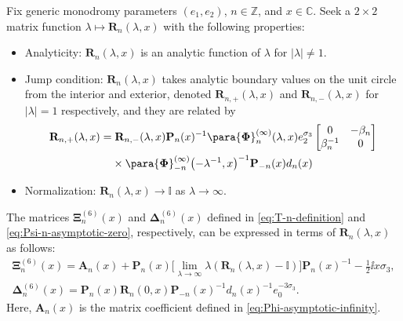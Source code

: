 \begin{rhp}
Fix generic monodromy parameters $( e_1, e_2)$, $n\in\mathbb{Z}$, and $x\in\mathbb{C}$. Seek a $2\times 2$ matrix function $\lambda\mapsto\mathbf{R}_n(\lambda,x)$ with the following properties:
\begin{itemize}\itemsep=0pt
 \item Analyticity: $\mathbf{R}_n(\lambda,x)$ is an analytic function of $\lambda$ for $|\lambda|\neq 1$.
 \item Jump condition:
 $\mathbf{R}_n(\lambda,x)$ takes analytic boundary values on the unit circle from the interior and exterior, denoted $\mathbf{R}_{n,+}(\lambda,x)$ and $\mathbf{R}_{n,-}(\lambda,x)$ for $|\lambda|=1$ respectively, and they are related by
 \begin{align}
 & \mathbf{R}_{n,+}(\lambda,x)= \mathbf{R}_{n,-}(\lambda,x)\mathbf{P}_n(x)^{-1}\para{\mathbf{\Phi}}_n^{(\infty)}(\lambda,x)e_2^{\sigma_3}\begin{bmatrix}0 & -\beta_n\\\beta_n^{-1} & 0\end{bmatrix}\nonumber\\
 &\hphantom{\mathbf{R}_{n,+}(\lambda,x)=}{} \times
 \para{\mathbf{\Phi}}_{-n}^{(\infty)}\bigl(-\lambda^{-1},x\bigr)^{-1}\mathbf{P}_{-n}(x)d_n(x)\label{eq:R-jump}
 \end{align}
 \item Normalization:
 $\mathbf{R}_n(\lambda,x)\to\mathbb{I}$ as $\lambda\to\infty$.
\end{itemize}
\end{rhp}
The matrices $\mathbf{\Xi}_n^{(6)}(x)$ and $\mathbf{\Delta}_n^{(6)}(x)$ defined in \eqref{eq:T-n-definition} and \eqref{eq:Psi-n-asymptotic-zero}, respectively, can be expressed in terms of $\mathbf{R}_n(\lambda,x)$ as follows:
\begin{gather}
 \mathbf{\Xi}_n^{(6)}(x)=\mathbf{A}_n(x)+\mathbf{P}_n(x)\big[\lim_{\lambda\to\infty}\lambda(\mathbf{R}_n(\lambda,x)-\mathbb{I})\big]\mathbf{P}_n(x)^{-1}-\frac{1}{2}\ii x\sigma_3,\nonumber\\
 \mathbf{\Delta}_n^{(6)}(x)=\mathbf{P}_n(x)\mathbf{R}_n(0,x)\mathbf{P}_{-n}(x)^{-1}d_n(x)^{-1}e_0^{-3\sigma_3}.\label{eq:TU-R}
\end{gather}
Here, $\mathbf{A}_n(x)$ is the matrix coefficient defined in \eqref{eq:Phi-asymptotic-infinity}.

